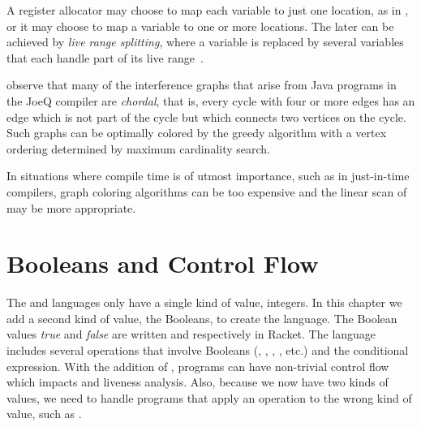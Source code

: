 \documentclass[11pt]{book}
\begin{document}
A register allocator may choose to map each variable to just one
location, as in \citet{Chaitin:1981vl}, or it may choose to map a
variable to one or more locations. The later can be achieved by
\emph{live range splitting}, where a variable is replaced by several
variables that each handle part of its live
range~\citep{Chow:1984ys,Briggs:1994kx,Cooper:1998ly}.






\citet{Palsberg:2007si} observe that many of the interference graphs
that arise from Java programs in the JoeQ compiler are \emph{chordal},
that is, every cycle with four or more edges has an edge which is not
part of the cycle but which connects two vertices on the cycle. Such
graphs can be optimally colored by the greedy algorithm with a vertex
ordering determined by maximum cardinality search.

In situations where compile time is of utmost importance, such as in
just-in-time compilers, graph coloring algorithms can be too expensive
and the linear scan of \citet{Poletto:1999uq} may be more appropriate.


\chapter{Booleans and Control Flow}
\label{ch:Rif}

The \LangInt{} and \LangVar{} languages only have a single kind of
value, integers. In this chapter we add a second kind of value, the
Booleans, to create the \LangIf{} language. The Boolean values
\emph{true} and \emph{false} are written  and 
respectively in Racket.  The \LangIf{} language includes several
operations that involve Booleans (, , ,
\key{<}, etc.) and the conditional  expression. With the
addition of , programs can have non-trivial control flow which
impacts  and liveness analysis. Also, because
we now have two kinds of values, we need to handle programs that apply
an operation to the wrong kind of value, such as .
\end{document}
